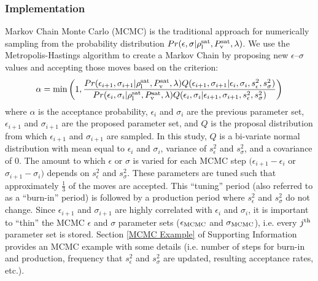 \documentclass[preprint,letterpaper,floatfix,citeautoscript,aip,jcp]{revtex4-1}
\begin{document}
\subsubsection{Implementation}
Markov Chain Monte Carlo (MCMC) is the traditional approach for numerically sampling from the probability distribution $Pr(\epsilon,\sigma|\rho_{\rm l}^{\rm sat},P_{\rm v}^{\rm sat},\lambda)$. We use the Metropolis-Hastings algorithm to create a Markov Chain by proposing new $\epsilon$--$\sigma$ values and accepting those moves based on the criterion:
\begin{equation} \label{eq:Acceptance}
\alpha = \min\left(1,\frac{Pr(\epsilon_{i+1},\sigma_{i+1}|\rho_{\rm l}^{\rm sat},P_{\rm v}^{\rm sat},\lambda)Q(\epsilon_{i+1},\sigma_{i+1}|\epsilon_i,\sigma_i,s^2_\epsilon,s^2_\sigma)}{Pr(\epsilon_i,\sigma_i|\rho_{\rm l}^{\rm sat},P_{\rm v}^{\rm sat},\lambda)Q(\epsilon_i,\sigma_i|\epsilon_{i+1},\sigma_{i+1},s^2_\epsilon,s^2_\sigma)}\right)
\end{equation} 
where $\alpha$ is the acceptance probability, $\epsilon_i$ and $\sigma_i$ are the previous parameter set, $\epsilon_{i+1}$ and $\sigma_{i+1}$ are the proposed parameter set, and $Q$ is the proposal distribution from which $\epsilon_{i+1}$ and $\sigma_{i+1}$ are sampled. In this study, $Q$ is a bi-variate normal distribution with mean equal to $\epsilon_i$ and $\sigma_i$, variance of $s^2_\epsilon$ and $s^2_\sigma$, and a covariance of 0. The amount to which $\epsilon$ or $\sigma$ is varied for each MCMC step $(\epsilon_{i+1} - \epsilon_i$ or $\sigma_{i+1} - \sigma_i)$ depends on $s^2_\epsilon$ and $s^2_\sigma$. These parameters are tuned such that approximately $\frac{1}{3}$ of the moves are accepted. This ``tuning'' period (also referred to as a ``burn-in'' period) is followed by a production period where $s^2_\epsilon$ and $s^2_\sigma$ do not change. Since $\epsilon_{i+1}$ and $\sigma_{i+1}$ are highly correlated with $\epsilon_i$ and $\sigma_i$, it is important to ``thin'' the MCMC $\epsilon$ and $\sigma$ parameter sets ($\epsilon_{\rm MCMC}$ and $\sigma_{\rm MCMC}$), i.e. every $j^{\rm th}$ parameter set is stored. Section \ref{MCMC Example} of Supporting Information provides an MCMC example with some details (i.e. number of steps for burn-in and production, frequency that $s^2_\epsilon$ and $s^2_\sigma$ are updated, resulting acceptance rates, etc.).
\end{document}
